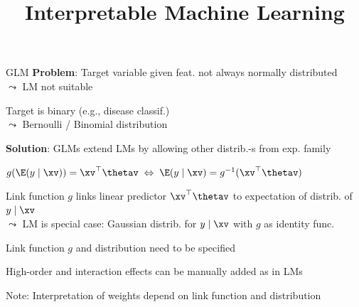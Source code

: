 \documentclass[10pt,compress,t,notes=noshow, xcolor=table]{beamer}
\title{Interpretable Machine Learning}
\begin{document}

\begin{framev}[align=top]{GLM }
\textbf{Problem}: Target variable given feat. not always normally distributed\\
$\leadsto$ LM not suitable
\begin{itemizeM}
\item Target is binary (e.g., disease classif.)\\
$\leadsto$ Bernoulli / Binomial distribution
\end{itemizeM}
\pause
\textbf{Solution}: GLMs extend LMs by allowing other distrib.-s from exp. family\\
\spacer[0.25]
\centerline{$g(\E(y \mid \xv)) = \xv^\top \thetav \; \Leftrightarrow \; \E(y \mid \xv) = g^{-1}(\xv^\top \thetav)$}
\spacer[0.25]
\begin{itemizeM}
\item Link function $g$ links linear predictor $\xv^\top \thetav$ to expectation of distrib. of $y \mid \xv$\\ %
$\leadsto$ LM is special case: Gaussian distrib. for $y \mid \xv$ with $g$ as identity func.
\item Link function $g$ and distribution need to be specified
\item High-order and interaction effects can be manually added as in LMs
\item Note: Interpretation of weights depend on link function and distribution

\end{itemizeM}
\end{framev}
\end{document}
